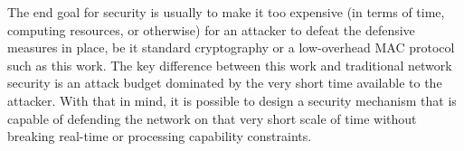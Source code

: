 The end goal for security is usually to make it too expensive (in terms of time, computing resources, or otherwise) for an attacker to defeat the defensive measures in place, be it standard cryptography or a low-overhead MAC protocol such as this work. The key difference between this work and traditional network security is an attack budget dominated by the very short time available to the attacker. With that in mind, it is possible to design a security mechanism that is capable of defending the network on that very short scale of time without breaking real-time or processing capability constraints.